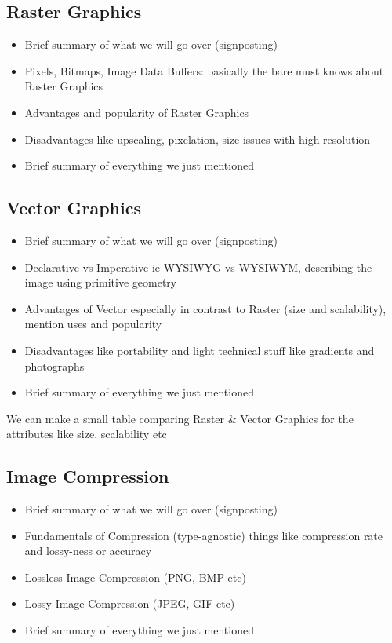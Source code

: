 \documentclass[12pt]{article}
\begin{document}
    \subsection{Raster Graphics}

    \begin{itemize}
        \item Brief summary of what we will go over (signposting)
        \item Pixels, Bitmaps, Image Data Buffers: basically the bare must knows about Raster Graphics
        \item Advantages and popularity of Raster Graphics
        \item Disadvantages like upscaling, pixelation, size issues with high resolution
        \item Brief summary of everything we just mentioned
    \end{itemize}

    \subsection{Vector Graphics}

    \begin{itemize}
        \item Brief summary of what we will go over (signposting)
        \item Declarative vs Imperative ie WYSIWYG vs WYSIWYM, describing the image using primitive geometry
        \item Advantages of Vector especially in contrast to Raster (size and scalability), mention uses and popularity
        \item Disadvantages like portability and light technical stuff like gradients and photographs
        \item Brief summary of everything we just mentioned
    \end{itemize}

    We can make a small table comparing Raster \& Vector Graphics for the attributes like size, scalability etc

    \subsection{Image Compression}

    \begin{itemize}
        \item Brief summary of what we will go over (signposting)
        \item Fundamentals of Compression (type-agnostic) things like compression rate and lossy-ness or accuracy
        \item Lossless Image Compression (PNG, BMP etc)
        \item Lossy Image Compression (JPEG, GIF etc)
        \item Brief summary of everything we just mentioned
    \end{itemize}
\end{document}
